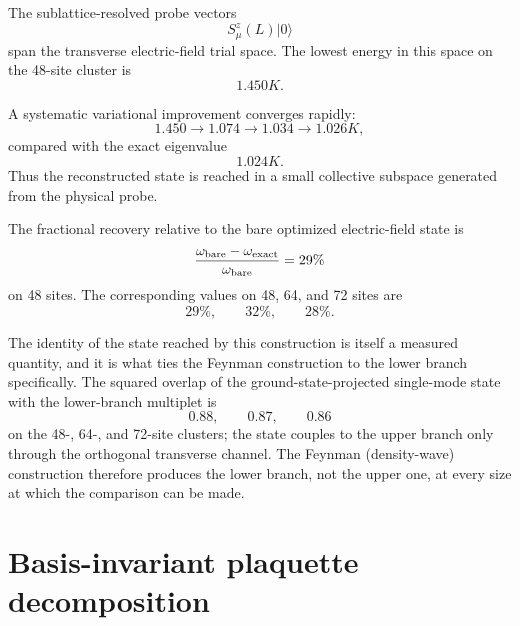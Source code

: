 \documentclass[
aps,
prl,
onecolumn,
amsmath,
amssymb,
superscriptaddress,
longbibliography
]{revtex4-2}
\begin{document}
The sublattice-resolved probe vectors
\begin{equation}
S_\mu^z(L)|0\rangle
\end{equation}
span the transverse electric-field trial space.
The lowest energy in this space on the 48-site cluster is
\begin{equation}
1.450K.
\end{equation}

A systematic variational improvement converges rapidly:
\begin{equation}
1.450
\rightarrow
1.074
\rightarrow
1.034
\rightarrow
1.026K,
\end{equation}
compared with the exact eigenvalue
\begin{equation}
1.024K.
\end{equation}
Thus the reconstructed state is reached in a small collective
subspace generated from the physical probe.

The fractional recovery relative to the bare optimized electric-field
state is
\begin{equation}
\frac{
\omega_{\rm bare}
-
\omega_{\rm exact}
}{
\omega_{\rm bare}
}
=
29\%
\end{equation}
on 48 sites.
The corresponding values on 48, 64, and 72 sites are
\begin{equation}
29\%,\qquad
32\%,\qquad
28\%.
\end{equation}

The identity of the state reached by this construction is itself a
measured quantity, and it is what ties the Feynman construction to
the lower branch specifically. The squared overlap of the
ground-state-projected single-mode state with the lower-branch
multiplet is
\begin{equation}
0.88,\qquad
0.87,\qquad
0.86
\end{equation}
on the 48-, 64-, and 72-site clusters; the state couples to the upper
branch only through the orthogonal transverse channel. The Feynman
(density-wave) construction therefore produces the lower branch, not
the upper one, at every size at which the comparison can be made.

\section{Basis-invariant plaquette decomposition}
\label{sec:backflow}
\end{document}
